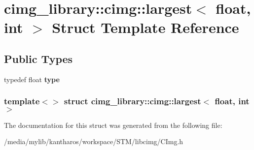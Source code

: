 \hypertarget{structcimg__library_1_1cimg_1_1largest_3_01float_00_01int_01_4}{
\section{cimg\_\-library::cimg::largest$<$ float, int $>$ Struct Template Reference}
\label{structcimg__library_1_1cimg_1_1largest_3_01float_00_01int_01_4}
}
\subsection*{Public Types}
\begin{DoxyCompactItemize}
\item 
\hypertarget{structcimg__library_1_1cimg_1_1largest_3_01float_00_01int_01_4_a196d0cdeb47f5af4aa9a93b58c45d8c4}{
typedef float {\bfseries type}}
\label{structcimg__library_1_1cimg_1_1largest_3_01float_00_01int_01_4_a196d0cdeb47f5af4aa9a93b58c45d8c4}

\end{DoxyCompactItemize}
\subsubsection*{template$<$$>$ struct cimg\_\-library::cimg::largest$<$ float, int $>$}



The documentation for this struct was generated from the following file:\begin{DoxyCompactItemize}
\item 
/media/mylib/kantharos/workspace/STM/libcimg/CImg.h\end{DoxyCompactItemize}

